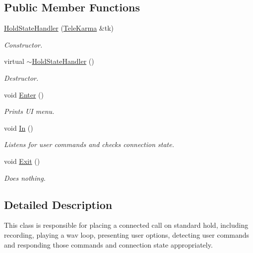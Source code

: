 \subsection*{Public Member Functions}
\begin{CompactItemize}
\item 
\hyperlink{classHoldStateHandler_66a0d60b47d1877c942f1d73cdd51142}{HoldStateHandler} (\hyperlink{classTeleKarma}{TeleKarma} \&tk)
\begin{CompactList}\small\item\em Constructor. \item\end{CompactList}\item 
virtual \hyperlink{classHoldStateHandler_f4ae8935de47b0016f9f002dc7737627}{$\sim$HoldStateHandler} ()
\begin{CompactList}\small\item\em Destructor. \item\end{CompactList}\item 
void \hyperlink{classHoldStateHandler_29f89f435a48b793e153ede7c5d94397}{Enter} ()
\begin{CompactList}\small\item\em Prints UI menu. \item\end{CompactList}\item 
void \hyperlink{classHoldStateHandler_5f9d46a1e14f04831c30399960d43387}{In} ()
\begin{CompactList}\small\item\em Listens for user commands and checks connection state. \item\end{CompactList}\item 
void \hyperlink{classHoldStateHandler_eb6c0ab072533f903b0ccb58e957c65a}{Exit} ()
\begin{CompactList}\small\item\em Does nothing. \item\end{CompactList}\end{CompactItemize}


\subsection{Detailed Description}
This class is responsible for placing a connected call on standard hold, including recording, playing a wav loop, presenting user options, detecting user commands and responding those commands and connection state appropriately. 

